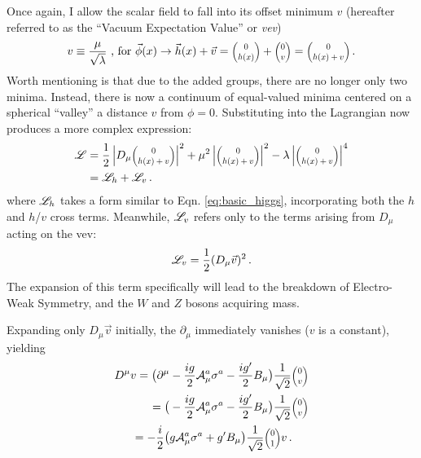     Once again, I allow the scalar field to fall into its offset minimum $v$
        (hereafter referred to as the ``Vacuum Expectation Value'' or \textit{vev})
    \begin{equation}
        v \equiv \frac{\mu}{\sqrt{\lambda}} \textrm{ ,  for   }
            \vec{\phi}(x) \to \vec{h}(x) + \vec{v} = 
            \minimatrix{0\\h(x)} + \minimatrix{0\\v} = \minimatrix{0\\h(x)+v}
        \,.
    \end{equation}
    Worth mentioning is that due to the added groups, there are no longer only two minima.
    Instead, there is now a continuum of equal-valued minima centered on a spherical ``valley'' a distance $v$ from $\phi=0$.
    Substituting into the Lagrangian now produces a more complex expression:
    \begin{equation} \begin{split}
        \label{eq:fullHiggs}
        \Lag & = \frac{1}{2} \left|D_{\mu} \minimatrix{0\\h(x)+v}\right|^2
            + \mu^2 \left|\minimatrix{0\\h(x)+v}\right|^2
            - \lambda \left|\minimatrix{0\\h(x)+v}\right|^4 \\
         & = \Lag_h + \Lag_v
        \,.
    \end{split} \end{equation}
    where $\mathscr{L}_h$ takes a form similar to Eqn. \ref{eq:basic_higgs}, incorporating both the $h$ and $h$/$v$ cross terms.
    Meanwhile, $\mathscr{L}_v$ refers only to the terms arising from $D_{\mu}$ acting on the vev:
    \begin{equation}
        \label{eq:lagv}
        \mathscr{L}_v = \frac{1}{2} (D_{\mu} \vec{v})^2
        \,.
    \end{equation}
    The expansion of this term specifically will lead to the breakdown of Electro-Weak Symmetry,
        and the $W$ and $Z$ bosons acquiring mass.

    Expanding only $D_{\mu} \vec{v}$ initially, the $\partial_{\mu}$ immediately vanishes ($v$ is a constant), yielding 
    \begin{equation} \begin{split}
        D^{\mu} v  = \big( \partial^{\mu} & - \frac{ig}{2} \wField^a_{\mu} \sigma^a - \frac{ig'}{2} B_{\mu} \big) \frac{1}{\sqrt{2}}\minimatrix{0\\v} \\
        = \big( & - \frac{ig}{2} \wField^a_{\mu} \sigma^a - \frac{ig'}{2} B_{\mu} \big) \frac{1}{\sqrt{2}}\minimatrix{0\\v} \\
        = - \frac{i}{2} \big( & g \wField^a_{\mu} \sigma^a + g' B_{\mu} \big) \frac{1}{\sqrt{2}}\minimatrix{0\\1} v
        \,.
    \end{split} \end{equation}

